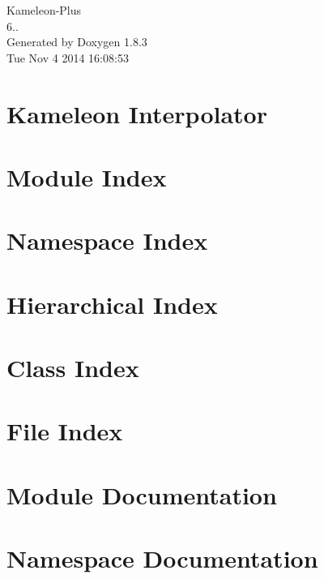 \documentclass{book}
\begin{document}
\hypersetup{pageanchor=false,citecolor=blue}
\begin{titlepage}
\vspace*{7cm}
\begin{center}
{\Large Kameleon-\/\-Plus \\[1ex]\large 6.. }\\
\vspace*{1cm}
{\large Generated by Doxygen 1.8.3}\\
\vspace*{0.5cm}
{\small Tue Nov 4 2014 16:08:53}\\
\end{center}
\end{titlepage}
\clearemptydoublepage
{}
\tableofcontents
\clearemptydoublepage
{}
\hypersetup{pageanchor=true,citecolor=blue}
\chapter{Kameleon Interpolator}
\label{index}\hypertarget{index}{}
\chapter{Module Index}

\chapter{Namespace Index}

\chapter{Hierarchical Index}

\chapter{Class Index}

\chapter{File Index}

\chapter{Module Documentation}







\chapter{Namespace Documentation}













\end{document}
